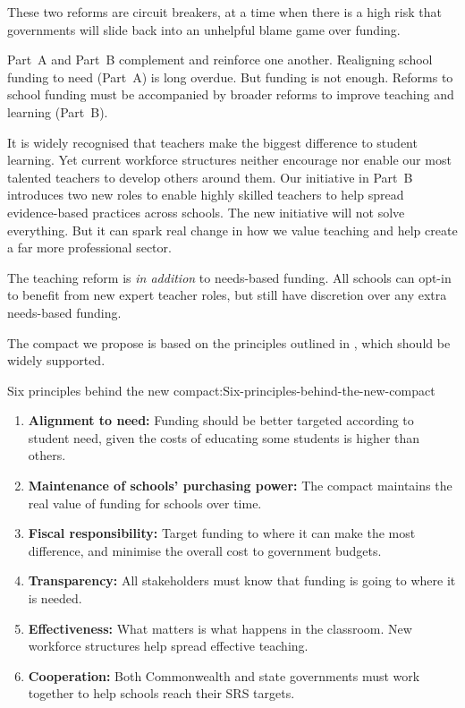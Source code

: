 \documentclass{grattan}
\begin{document}
These two reforms are circuit breakers, at a time when there is a high risk that governments will slide back into an unhelpful blame game over funding.

Part~A and Part~B complement and reinforce one another.
Realigning school funding to need (Part~A) is long overdue.
But funding is not enough.
Reforms to school funding must be accompanied by broader reforms to improve teaching and learning (Part~B).

It is widely recognised that teachers make the biggest difference to student learning.
Yet current workforce structures neither encourage nor enable our most talented teachers to develop others around them.
Our initiative in Part~B introduces two new roles to enable highly skilled teachers to help spread evidence-based practices across schools.
The new initiative will not solve everything.
But it can spark real change in how we value teaching and help create a far more professional sector.

The teaching reform is \emph{in addition} to needs-based funding. All schools can opt-in to benefit from new expert teacher roles, but still have discretion over any extra needs-based funding.

The compact we propose is based on the principles outlined in , which should be widely supported.

\begin{verysmallbox}{Six principles behind the new compact:}{Six-principles-behind-the-new-compact}
\begin{enumerate}[leftmargin=1.7em]
\item \textbf{Alignment to need:}
Funding should be better targeted according to student need, given the costs of educating some students is higher than others.

\item \textbf{Maintenance of schools' purchasing power:}
The compact maintains the real value of funding for schools over time.

\item \textbf{Fiscal responsibility:} Target funding to where it can make the most difference, and minimise the overall cost to government budgets.

\item \textbf{Transparency:}
All stakeholders must know that funding is going to where it is needed.

\item \textbf{Effectiveness:}
What matters is what happens in the classroom. New workforce structures help spread effective teaching.

\item \textbf{Cooperation:} Both Commonwealth and state governments must work together to help schools reach their SRS targets.
\end{enumerate}
\end{verysmallbox}
\end{document}

